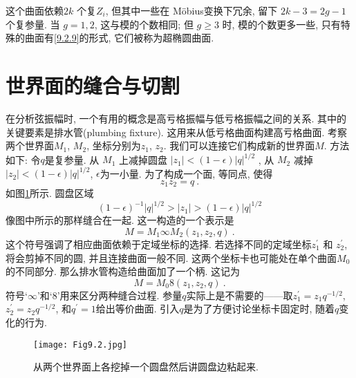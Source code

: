 这个曲面依赖$2 k$ 个复$Z_{i}$, 但其中一些在 Möbius变换下冗余, 留下 $2 k-3=2 g-1$个复参量. 当 $g=1,2$, 这与模的个数相同; 
但 $g \geq 3$ 时, 模的个数更多一些, 只有特殊的曲面有\eqref{9.2.9}的形式, 它们被称为超椭圆曲面.

\section{世界面的缝合与切割}  \label{sec:9.3}%

在分析弦振幅时, 一个有用的概念是高亏格振幅与低亏格振幅之间的关系. 其中的关键要素是排水管(plumbing fixture). 
这用来从低亏格曲面构建高亏格曲面. 考察两个世界面$M_{1}$,  $M_{2}$, 坐标分别为$z_{1}$, $z_{2}$. 
我们可以连接它们构成新的世界面$M$. 方法如下: 令$q$是复参量. 从 $M_{1}$ 上减掉圆盘 $|z_{1}|<(1-\epsilon)|q|^{1/2}$ , 
从 $M_{2}$ 减掉 $|z_{2}|<(1-\epsilon)|q|^{1/2}$, $\epsilon$为一小量. 为了构成一个面, 等同点, 使得
\begin{equation}
	z_{1} z_{2}=q \:. \label{9.3.1}
\end{equation}
如图\ref{Fig9.2}所示. 圆盘区域
\begin{equation}
	(1-\epsilon)^{-1}|q|^{1/2} > |z_{1}| > (1-\epsilon)|q|^{1/2} \label{9.3.2}
\end{equation}
像图中所示的那样缝合在一起. 这一构造的一个表示是
\begin{equation}
	M=M_{1} \infty M_{2}(z_{1}, z_{2}, q) \:. \label{9.3.3}
\end{equation}
这个符号强调了相应曲面依赖于定域坐标的选择. 若选择不同的定域坐标$z_{1}^{\prime}$ 和 $z_{2}^{\prime}$, 将会剪掉不同的圆, 并且连接曲面一般不同. 
这两个坐标卡也可能处在单个曲面$M_{0}$的不同部分. 那么排水管构造给曲面加了一个柄. 这记为
\begin{equation}
	M=M_{0} 8(z_{1}, z_{2}, q)  \:. \label{9.3.4}
\end{equation}
符号`$\infty$'和`8'用来区分两种缝合过程. 参量$q$实际上是不需要的——取$z_{1}^{\prime}=z_{1} q^{-1/2}$, $z_{2}^{\prime}=z_{2} q^{-1/2}$, 
和$q^{\prime}=1$给出等价曲面. 引入$q$是为了方便讨论坐标卡固定时, 随着$q$变化的行为.

\begin{figure}
	\begin{center}
		\texttt{[image: Fig9.2.jpg]}\\
		\caption{从两个世界面上各挖掉一个圆盘然后讲圆盘边粘起来.}\label{Fig9.2}
	\end{center}
\end{figure}

